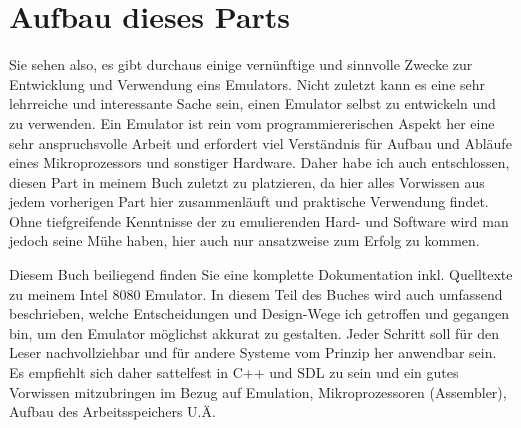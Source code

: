 \documentclass[b5paper,10pt,dvips,fleqn,titlepage,twoside]{book}
\begin{document}
\section{Aufbau dieses Parts}
Sie sehen also, es gibt durchaus einige vernünftige und sinnvolle Zwecke zur Entwicklung und Verwendung eins Emulators.
Nicht zuletzt kann es eine sehr lehrreiche und interessante Sache sein, einen Emulator selbst zu entwickeln und zu verwenden. Ein Emulator ist rein vom programmiererischen Aspekt her eine sehr anspruchsvolle Arbeit und erfordert viel Verständnis für Aufbau und Abläufe eines Mikroprozessors und sonstiger Hardware. Daher habe ich auch entschlossen, diesen Part in meinem Buch zuletzt zu platzieren, da hier alles Vorwissen aus jedem vorherigen Part hier zusammenläuft und praktische Verwendung findet. Ohne tiefgreifende Kenntnisse der zu emulierenden Hard- und Software wird man jedoch seine Mühe haben, hier auch nur ansatzweise zum Erfolg zu kommen.

Diesem Buch beiliegend finden Sie eine komplette Dokumentation inkl. Quelltexte zu meinem Intel 8080 Emulator. In diesem Teil des Buches wird auch umfassend beschrieben, welche Entscheidungen und Design-Wege ich getroffen und gegangen bin, um den Emulator möglichst akkurat zu gestalten. Jeder Schritt soll für den Leser nachvollziehbar und für andere Systeme vom Prinzip her anwendbar sein.\newline
Es empfiehlt sich daher sattelfest in C++ und SDL zu sein und ein gutes Vorwissen mitzubringen im Bezug auf Emulation, Mikroprozessoren (Assembler), Aufbau des Arbeitsspeichers U.Ä.
\end{document}
